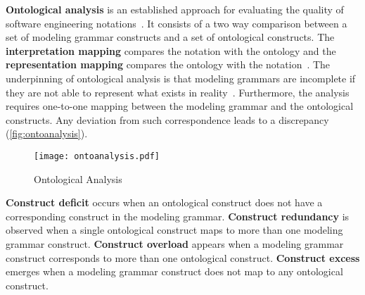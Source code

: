 \textbf{Ontological analysis} is an established approach for evaluating the quality of software engineering notations~\cite{moody2009physics}. It consists of a two way comparison between a set of modeling grammar constructs and a set of ontological constructs. The \textbf{interpretation mapping} compares the notation with the ontology and the \textbf{representation mapping} compares the ontology with the notation~\cite{gehlert2007toward}. The underpinning of ontological analysis is that modeling grammars are incomplete if they are not able to represent what exists in reality~\cite{green2000integrated}. Furthermore, the analysis requires one-to-one mapping between the modeling grammar and the ontological constructs. Any deviation from such correspondence leads to a discrepancy (\autoref{fig:ontoanalysis}).

\begin{figure}[b]
  \centering
  \caption{Ontological Analysis~\cite[p.92]{Weber1997}}
  \label{fig:ontoanalysis}
  \texttt{[image: ontoanalysis.pdf]}
\end{figure}

\textbf{Construct deficit} occurs when an ontological construct does not have a corresponding construct in the modeling grammar. \textbf{Construct redundancy} is observed when a single ontological construct maps to more than one modeling grammar construct. \textbf{Construct overload} appears when a modeling grammar construct corresponds to more than one ontological construct. \textbf{Construct excess} emerges when a modeling grammar construct does not map to any ontological construct.~\cite{moody2009physics}

